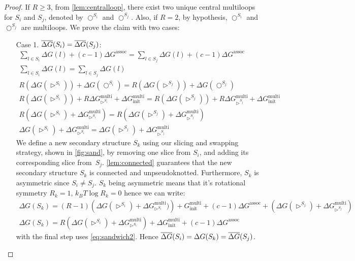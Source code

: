 \begin{proof}
	If $R \geq 3$,  from \cref{lem:centralloop},  there exist two unique central multiloops for $S_i$ and $S_j$, denoted  by $\bigcirc^{S_i}$ and $\bigcirc^{S_j}$. Also, if $R=2$, by hypothesis, $\bigcirc^{S_i}$ and $\bigcirc^{S_j}$ are multiloops. 
	We prove the claim with two cases:
	\begin{enumerate}
		\item[Case 1.]  $\overline{\Delta G}(S_i) = \overline{\Delta G}(S_j)$: 
		\begin{gather}
			\sum_{l\in S_i} \Delta G(l)
			+  (c-1)\Delta G^{\textrm{assoc}} = \sum_{l\in S_j} \Delta G(l)
			+  (c-1)\Delta G^{\textrm{assoc}} \label{eq:sandwich1}
			\\
			\sum_{l\in S_i} \Delta G(l)
			= \sum_{l\in S_j} \Delta G(l)
			\\
			R(\Delta G(\rhd^{S_i}))+ \Delta G(\bigcirc^{S_i})
			= R(\Delta G(\rhd^{S_j}))+ \Delta G(\bigcirc^{S_j})
			\\
			R(\Delta G(\rhd^{S_i})) + R \Delta G_{\rhd^{S_i}}^\textrm{multi} + \Delta G^\textrm{multi}_\textrm{init}
			= 	R(\Delta G(\rhd^{S_j})) + R \Delta G_{\rhd^{S_j}}^\textrm{multi} +  \Delta G^\textrm{multi}_\textrm{init}
			\\
			R(\Delta G(\rhd^{S_i}) + \Delta G_{\rhd^{S_i}}^\textrm{multi} ) = R(\Delta G(\rhd^{S_j}) + \Delta G_{\rhd^{S_j}}^\textrm{multi})
			\\
			\Delta G(\rhd^{S_i}) + \Delta G_{\rhd^{S_i}}^\textrm{multi}  = \Delta G(\rhd^{S_j}) + \Delta G_{\rhd^{S_j}}^\textrm{multi} \label{eq:sandwich2}
		\end{gather}
		We define a new secondary structure $S_k$ using our slicing and swapping strategy, shown in \cref{fig:sand}, by removing one slice from $S_i$, and adding its corresponding slice from~$S_j$. 
		\cref{lem:connected} guarantees that the new secondary structure  $S_k$ is connected and unpseudoknotted. Furthermore,  $S_k$ is asymmetric since $S_i \neq S_j$. 
		$S_k$ being asymmetric means that it's rotational symmetry $R_k=1$, $k_B T \log R_k = 0$ hence we can write: 
		\begin{gather*}
			\Delta G(S_k) = (R-1)\left( \Delta G(\rhd^{S_i}) + \Delta G_{\rhd^{S_i}}^\textrm{multi}) \right) + 
			G^\textrm{multi}_\textrm{init} + (c-1)\Delta G^{\textrm{assoc}} + \left(	\Delta G(\rhd^{S_j}) +\Delta G_{\rhd^{S_j}}^\textrm{multi} \right)
			\\
			\Delta G(S_k) = R\left(\Delta G(\rhd^{S_i}) +  \Delta G_{\rhd^{S_i}}^\textrm{multi} \right) + \Delta G^\textrm{multi}_\textrm{init} + (c-1)\Delta G^{\textrm{assoc}}
		\end{gather*}
		with the final step uses \cref{eq:sandwich2}. 
		Hence  $\overline{\Delta G}(S_i) = \Delta G(S_k) = \overline{\Delta G}(S_j)$. 
		

\end{enumerate}
\end{proof}
